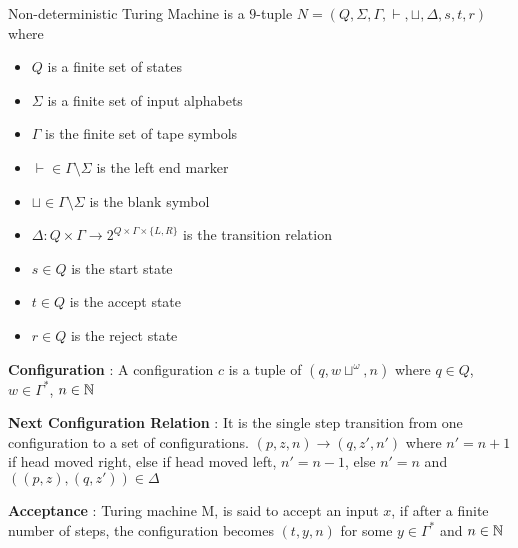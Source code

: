 Non-deterministic Turing Machine is a $9$-tuple $N = (Q, \Sigma, \Gamma, \vdash, \sqcup, \Delta, s, t, r)$ where

\begin{itemize}
    \item $Q$ is a finite set of states
    \item $\Sigma$ is a finite set of input alphabets
    \item $\Gamma$ is the finite set of tape symbols
    \item $\vdash \in \Gamma \setminus \Sigma$ is the left end marker
    \item $\sqcup \in \Gamma \setminus \Sigma$ is the blank symbol
    \item $\Delta : Q \times \Gamma  \rightarrow 2 ^ {Q \times \Gamma \times \{L, R\}}$ is the transition relation
    \item $s \in Q$ is the start state
    \item $t \in Q$ is the accept state
    \item $r \in Q$ is the reject state
\end{itemize}

\textbf{Configuration} :
\newline
A configuration $c$ is a tuple of $(q, w\sqcup ^ \omega, n)$ where $q \in Q$, $w \in \Gamma^*$, $n \in \mathbb{N}$

\textbf{Next Configuration Relation} :
\newline
It is the single step transition from one configuration to a set of configurations.
$(p, z, n) \rightarrow (q, z', n')$ where 
$ n' = n + 1$ if head moved right, else if head moved left, $n' = n - 1$, else $n' = n$ and $((p, z), (q, z')) \in \Delta$

\textbf{Acceptance} : 
\newline
Turing machine M, is said to accept an input $x$, if after a finite number of steps, the configuration becomes $(t, y, n)$ for some $y \in \Gamma ^ *$ and $n \in \mathbb{N}$


